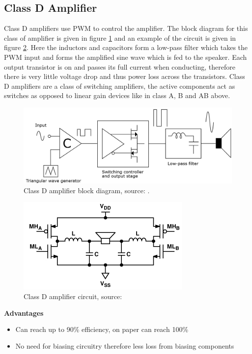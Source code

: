 \documentclass[12pt, a4paper]{article}
\begin{document}
	\subsection{Class D Amplifier}
	Class D amplifiers use PWM to control the amplifier. The block diagram for this class of amplifier is given in figure \ref{fig:classDAmplifier} and an example of the circuit is given in figure \ref{fig:classDAmplifierCircuit}. Here the inductors and capacitors form a low-pass filter which takes the PWM input and forms the amplified sine wave which is fed to the speaker. Each output transistor is on and passes its full current when conducting, therefore there is very little voltage drop and thus power loss across the transistors. Class D amplifiers are a class of switching amplifiers, the active components act as switches as opposed to linear gain devices like in class A, B and AB above.
	\begin{figure} [!htb]
		\includegraphics[scale=0.5]{./Figures/class_D_amplifier}
		\caption{Class D amplifier block diagram, source: \cite{classDamplifiercircuit}.}
		\label{fig:classDAmplifier}
	\end{figure}
	\begin{figure} [!htb]
		\hfill\includegraphics{./Figures/class_D_amplifier2}\hspace*{\fill}	
		\caption{Class D amplifier circuit, source: \cite{classDamplifier}}
		\label{fig:classDAmplifierCircuit}
	\end{figure}
	
	\textbf{Advantages}
	\begin{itemize}
		\item Can reach up to 90\% efficiency, on paper can reach 100\%
		\item No need for biasing circuitry therefore less loss from biasing components
	\end{itemize}
	
\end{document}
